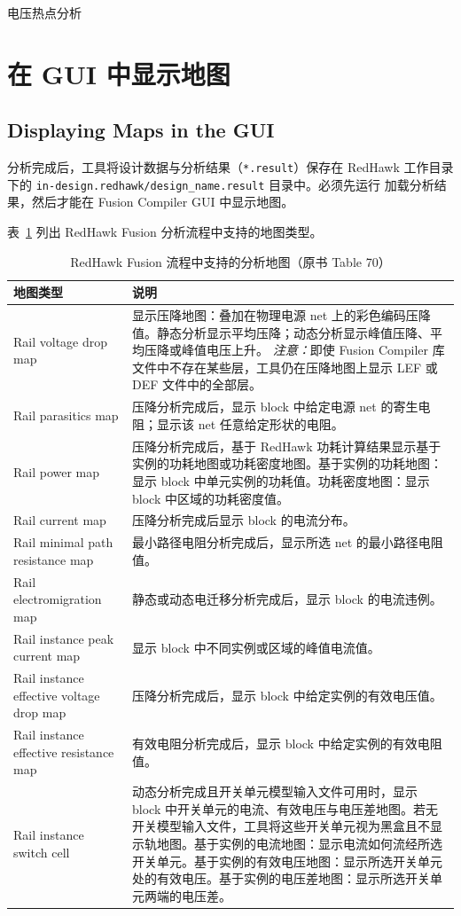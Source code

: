 \begin{seeAlsoBox}
电压热点分析
\end{seeAlsoBox}

\section{在 GUI 中显示地图}
\subsection*{Displaying Maps in the GUI}

分析完成后，工具将设计数据与分析结果（\texttt{*.result}）保存在 RedHawk 工作目录下的 \texttt{in-design.redhawk/design\_name.result} 目录中。必须先运行  加载分析结果，然后才能在 Fusion Compiler GUI 中显示地图。

表~\ref{tab:map-types} 列出 RedHawk Fusion 分析流程中支持的地图类型。

\begin{table}[htbp]
\centering
\caption{RedHawk Fusion 流程中支持的分析地图（原书 Table 70）}
\label{tab:map-types}
\small
\begin{tabularx}{\textwidth}{@{}l X@{}}
\toprule
\textbf{地图类型} & \textbf{说明} \\
\midrule
Rail voltage drop map &
显示压降地图：叠加在物理电源 net 上的彩色编码压降值。静态分析显示平均压降；动态分析显示峰值压降、平均压降或峰值电压上升。
\textit{注意：}即使 Fusion Compiler 库文件中不存在某些层，工具仍在压降地图上显示 LEF 或 DEF 文件中的全部层。 \\
Rail parasitics map &
压降分析完成后，显示 block 中给定电源 net 的寄生电阻；显示该 net 任意给定形状的电阻。 \\
Rail power map &
压降分析完成后，基于 RedHawk 功耗计算结果显示基于实例的功耗地图或功耗密度地图。基于实例的功耗地图：显示 block 中单元实例的功耗值。功耗密度地图：显示 block 中区域的功耗密度值。 \\
Rail current map &
压降分析完成后显示 block 的电流分布。 \\
Rail minimal path resistance map &
最小路径电阻分析完成后，显示所选 net 的最小路径电阻值。 \\
Rail electromigration map &
静态或动态电迁移分析完成后，显示 block 的电流违例。 \\
Rail instance peak current map &
显示 block 中不同实例或区域的峰值电流值。 \\
Rail instance effective voltage drop map &
压降分析完成后，显示 block 中给定实例的有效电压值。 \\
Rail instance effective resistance map &
有效电阻分析完成后，显示 block 中给定实例的有效电阻值。 \\
Rail instance switch cell &
动态分析完成且开关单元模型输入文件可用时，显示 block 中开关单元的电流、有效电压与电压差地图。若无开关模型输入文件，工具将这些开关单元视为黑盒且不显示轨地图。基于实例的电流地图：显示电流如何流经所选开关单元。基于实例的有效电压地图：显示所选开关单元处的有效电压。基于实例的电压差地图：显示所选开关单元两端的电压差。 \\
\bottomrule
\end{tabularx}
\end{table}

